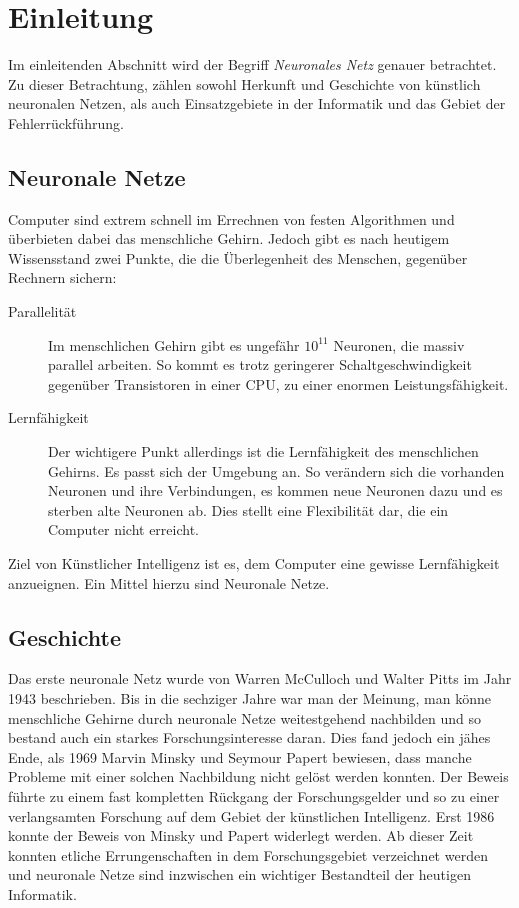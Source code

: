 \section{Einleitung}
Im einleitenden Abschnitt wird der Begriff \emph{Neuronales Netz} genauer betrachtet. Zu die\-ser Betrachtung, zählen sowohl Herkunft und Geschichte von künstlich neuronalen Netzen, als auch Einsatzgebiete in der Informatik und das Gebiet der Fehler\-rück\-führ\-ung.

\subsection{Neuronale Netze}
Computer sind extrem schnell im Errechnen von festen Algorithmen und überbieten dabei das menschliche Gehirn. Jedoch gibt es nach heutigem Wissensstand zwei Punkte, die die Überlegenheit des Menschen, ge\-gen\-über Rechnern sichern:
\begin{description}
  \item[Parallelität] Im menschlichen Gehirn gibt es ungefähr \(10^{11}\) Neuronen, die massiv parallel arbeiten. So kommt es tro\-tz geringerer Schaltgeschwindigkeit ge\-gen\-über Transistoren in einer CPU, zu einer enormen Leistungsfähigkeit. \cite{bib:dkriesel} 
  \item[Lernfähigkeit] Der wichtigere Punkt allerdings ist die Lernfähigkeit des mensch\-li\-chen Gehirns. Es passt sich der Umgebung an. So verändern sich die vorhanden Neuronen und ihre Verbindungen, es kommen neue Neuronen dazu und es sterben alte Neuronen ab. Dies stellt eine Flexibilität dar, die ein Computer nicht erreicht.
\end{description}
Ziel von Künstlicher Intelligenz ist es, dem Computer eine gewisse Lernfähigkeit an\-zu\-eig\-nen. Ein Mittel hierzu sind Neuronale Netze.

\subsection{Geschichte}
Das erste neuronale Netz wurde von Warren McCulloch und Walter Pitts im Jahr 1943 beschrieben. Bis in die sechziger Jahre war man der Meinung, man könne menschliche Gehirne durch neuronale Netze wei\-test\-ge\-hend nachbilden und so bestand auch ein starkes Forsch\-ungs\-in\-ter\-es\-se daran. Dies fand jedoch ein jähes Ende, als 1969 Marvin Minsky und Seymour Papert bewiesen, dass manche Pro\-ble\-me mit einer solchen Nachbildung nicht gelöst werden konnten. Der Beweis führte zu einem fast kompletten Rückgang der For\-schungs\-gel\-der und so zu einer verlangsamten For\-schung auf dem Gebiet der künstlichen Intelligenz. Erst 1986 konnte der Beweis von Minsky und Papert widerlegt werden. Ab dieser Zeit konnten etliche Errungenschaften in dem For\-schungs\-ge\-biet verzeichnet werden und neuronale Netze sind inzwischen ein wichtiger Bestandteil der heutigen Informatik. \cite{bib:dkriesel}

